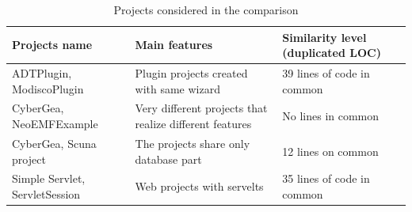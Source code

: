 \begin{center}
	\begin{table}[!h]
		\caption{ Projects considered in the comparison }
		\label{Table:4}
		\begin{adjustbox}{width=1\textwidth}
			\small
			\begin{tabular}{|l|p{5cm}|p{3cm}|}
				
				\hline
				\textbf{Projects name} &  \textbf{Main features}  & 
				\textbf{Similarity level (duplicated LOC)}  \\
				\hline
				ADTPlugin, ModiscoPlugin   &  Plugin projects created with same 
				wizard & 39 lines of code in common\\
				\hline
				CyberGea, NeoEMFExample &   Very different projects that 
				realize different features & No lines in common\\
				\hline
				CyberGea, Scuna project & The projects share only database part 
				& 12 lines on common  \\
				\hline
				Simple Servlet, ServletSession &  Web projects with servelts & 
				35 lines of code in common  \\
				\hline
			\end{tabular}
			
		\end{adjustbox}
	\end{table} 
\end{center}

